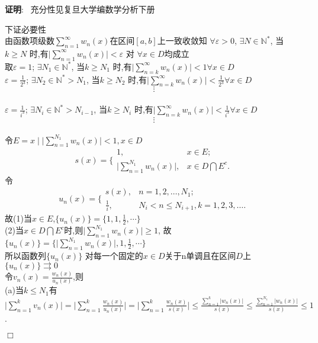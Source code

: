 \documentclass[a4paper,12pt,hyperref,twoside]{ctexart}
\numberwithin{equation}{section}
\newenvironment{proof}[1][\indent 证明]
    {\textbf {#1}:~}
    {\hfill $\Box$}
\begin{document}
\begin{proof}
充分性见复旦大学编数学分析下册

下证必要性\\
由函数项级数$\sum\limits_{n=1}^{\infty}{w_n(x)}$在区间$[a,b]$上一致收敛知
$\forall\varepsilon>0$, $\exists  N\in\mathbb{ N^{*}}$, 当$k\geq N$ 时,有${\vert{\sum\limits_{n=1}^{\infty}{w_n(x)}}\vert}<\varepsilon$ 对 $\forall x\in D$均成立\\
取$\varepsilon=1$; $\exists  N_1\in\mathbb{ N^{*}}$, 当$k\geq N_1$ 时,有${\vert{\sum\limits_{n=k}^{\infty}{w_n(x)}}\vert}<1$\qquad$\forall x\in D$\\
$\varepsilon=\frac{1}{2^3}$; $\exists  N_2\in\mathbb{ N^{*}}>N_{1}$, 当$k\geq N_2$ 时,有${\vert{\sum\limits_{n=k}^{\infty}{w_n(x)}}\vert}<\frac{1}{2^3}$\qquad$\forall x\in D$\\
$$\vdots$$\\
$\varepsilon=\frac{1}{i^3}$; $\exists  N_i\in\mathbb{ N^{*}}>N_{i-1}$, 当$k\geq N_i$ 时,有${\vert{\sum\limits_{n=k}^{\infty}{w_n(x)}}\vert}<\frac{1}{i^3}$\qquad$\forall x\in D$\\
$$\vdots$$\\
令$E={x\mid{\vert{\sum\limits_{n=1}^{N_1}{w_n(x)}}\vert<1},x\in D}$\\
$$
{s(x)}=\bigg\{\!\!\!
\begin{array}{ll}
1,&x\in E;\\[-15pt]
\vert{\sum\limits_{n=1}^{N_1}{w_n(x)}}\vert,&x\in{D\bigcap E^c}.
\end{array}
$$
令
$$
{u_n(x)}=\bigg\{\!\!\!
\begin{array}{ll}
s(x),&n=1,2,\ldots,N_1;\\[-15pt]
\frac{1}{i},&N_i<n\leq N_{i+1}, k=1,2,3,\dots.
\end{array}
$$
故(1)当$x\in E$,$\{u_n(x)\}=\{1,1,\frac{1}{2},\cdots\}$\\
(2)当$x\in{D\bigcap E^c}$时,则$\vert{\sum\limits_{n=1}^{N_1}{w_n(x)}}\vert\geq 1$, 故$\{u_n(x)\}=\{\vert{\sum\limits_{n=1}^{N_1}{w_n(x)}}\vert,1,\frac{1}{2},\cdots\}$\\
所以函数列$\{u_n(x)\}$ 对每一个固定的$x\in D$关于n单调且在区间$D$上$\{u_n(x)\}\rightrightarrows0$\\
令$v_n(x)=\frac{w_n(x)}{u_n(x)}$,则\\
(a)当$k\leq N_1$有
$\vert\sum_{n=1}^kv_n(x)\vert=\vert\sum_{n=1}^k\frac{w_n(x)}{u_n(x)}\vert=
\vert\sum_{n=1}^k\frac{w_n(x)}{s(x)}\vert
\le\frac{\sum_{n=1}^k\vert w_n(x)\vert}{s(x)}
\le\frac{\sum_{n=1}^{N_1}\vert w_n(x)\vert}{s(x)}\le 1$.


\end{proof}
\end{document}
